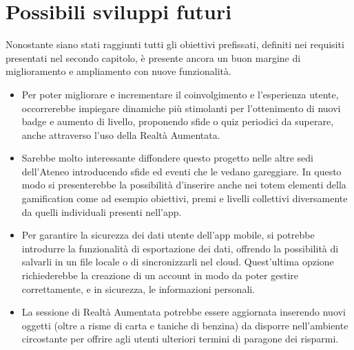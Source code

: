 \section*{Possibili sviluppi futuri}
Nonostante siano stati raggiunti tutti gli obiettivi prefissati, definiti nei requisiti presentati nel secondo capitolo, è presente ancora un buon margine di miglioramento e ampliamento con nuove funzionalità.
\begin{itemize}
    \itemsep1em
    \item Per poter migliorare e incrementare il coinvolgimento e l'esperienza utente, occorrerebbe impiegare dinamiche più stimolanti per l'ottenimento di nuovi badge e aumento di livello, proponendo sfide o quiz periodici da superare, anche attraverso l'uso della Realtà Aumentata.
    \item Sarebbe molto interessante diffondere questo progetto nelle altre sedi dell'Ateneo introducendo sfide ed eventi che le vedano gareggiare. In questo modo si presenterebbe la possibilità d'inserire anche nei totem elementi della gamification come ad esempio obiettivi, premi e livelli collettivi diversamente da quelli individuali presenti nell'app.
    \item Per garantire la sicurezza dei dati utente dell'app mobile, si potrebbe introdurre la funzionalità di esportazione dei dati, offrendo la possibilità di salvarli in un file locale o di sincronizzarli nel cloud. Quest'ultima opzione richiederebbe la creazione di un account in modo da poter gestire correttamente, e in sicurezza, le informazioni personali.
    \item La sessione di Realtà Aumentata potrebbe essere aggiornata inserendo nuovi oggetti (oltre a risme di carta e taniche di benzina) da disporre nell'ambiente circostante per offrire agli utenti ulteriori termini di paragone dei risparmi.
\end{itemize}
